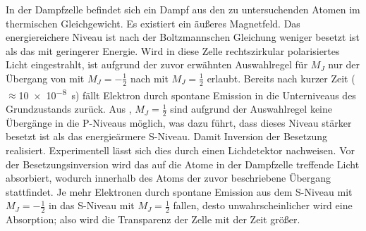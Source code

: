 In der Dampfzelle befindet sich ein Dampf aus den zu untersuchenden Atomen im thermischen Gleichgewicht. Es existiert ein äußeres Magnetfeld. Das energiereichere Niveau ist nach der Boltzmannschen Gleichung weniger besetzt ist als das mit geringerer Energie. Wird in diese Zelle rechtszirkular polarisiertes Licht eingestrahlt, ist aufgrund der zuvor erwähnten Auswahlregel für $M_J$ nur der Übergang von  mit $M_J=-\frac{1}{2}$ nach  mit $M_J=\frac{1}{2}$ erlaubt. Bereits nach kurzer Zeit ($\approx$\SI{10e-8}{\second}) fällt Elektron durch spontane Emission in die Unterniveaus des Grundzustands zurück. Aus , $M_J= \frac{1}{2}$ sind aufgrund der Auswahlregel keine Übergänge in die P-Niveaus möglich, was dazu führt, dass dieses Niveau stärker besetzt ist als das energieärmere S-Niveau. Damit Inversion der Besetzung realisiert. Experimentell lässt sich dies durch einen Lichdetektor nachweisen. Vor der Besetzungsinversion wird das auf die  Atome in der Dampfzelle  treffende Licht absorbiert, wodurch innerhalb des Atoms der zuvor beschriebene Übergang stattfindet. Je mehr Elektronen durch spontane Emission aus dem S-Niveau mit $M_J=-\frac{1}{2}$ in das S-Niveau mit $M_J = \frac{1}{2}$ fallen, desto unwahrscheinlicher wird eine Absorption; also wird die Transparenz der Zelle mit der Zeit größer.

